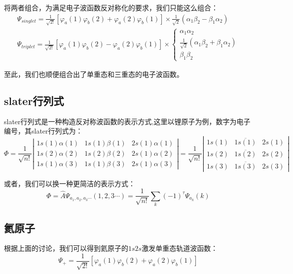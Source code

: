 将两者组合，为满足电子波函数反对称化的要求，我们只能这么组合：
\[
    \begin{array}{l}
        \varPsi_{singlet}=\frac{1}{\sqrt{2!}}[\varphi_a(1)\varphi_b(2)+\varphi_a(2)\varphi_b(1)]\times\frac{1}{\sqrt{2}}(\alpha_1\beta_2-\beta_1\alpha_2)\\
        \varPsi_{triplet}=\frac{1}{\sqrt{2!}}[\varphi_a(1)\varphi_b(2)-\varphi_a(2)\varphi_b(1)]\times \left \{
            \begin{array}{l}
                \alpha_1\alpha_2\\
                \frac{1}{\sqrt{2}}(\alpha_1\beta_2+\beta_1\alpha_2)\\
                \beta_1\beta_2
            \end{array}
        \right .
    \end{array}
\]

至此，我们也顺便组合出了单重态和三重态的电子波函数。

\subsection{slater行列式}
slater行列式是一种构造反对称波函数的表示方式,这里以锂原子为例，数字为电子编号，其slater行列式为：
\[\varPhi=\frac{1}{\sqrt{n!}}
\left |
\begin{array}{lll}
1s(1)\alpha(1) & 1s(1)\beta(1) & 2s(1)\alpha(1) \\
1s(2)\alpha(2) & 1s(2)\beta(2) & 2s(1)\alpha(2) \\
1s(1)\alpha(3) & 1s(1)\beta(3) & 2s(1)\alpha(3)
\end{array}
\right |
=\frac{1}{\sqrt{n!}}
\left |
\begin{array}{lll}
1s(1) & \overline{1s(1)} & 2s(1) \\
1s(2) & \overline{1s(2)} & 2s(2) \\
1s(3) & \overline{1s(3)} & 2s(3)
\end{array}
\right |
\]

或者，我们可以换一种更简洁的表示方式：
\[\varPhi=\hat{A}\varPsi_{a_1,a_2,a_3 \cdots}(1,2,3\cdots)=\frac{1}{\sqrt{n!}}\sum_k(-1)^{\tau}\varPsi_{a_k}(k)\]

\subsection{氦原子}
根据上面的讨论，我们可以得到氦原子的$1s2s$激发单重态轨道波函数：
\[\varPsi_{+}=\frac{1}{\sqrt{2!}}[\varphi_a(1)\varphi_b(2)+\varphi_a(2)\varphi_b(1)]\]


